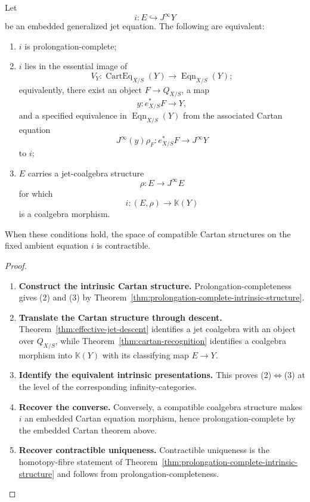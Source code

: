 \begin{corollary}
Let
\[
  i:E\hookrightarrow J^\infty Y
\]
be an embedded generalized jet equation. The following are equivalent:
\begin{enumerate}
\item \(i\) is prolongation-complete;
\item \(i\) lies in the essential image of
\[
  V_Y:
  \operatorname{CartEq}_{X/S}(Y)\longrightarrow\operatorname{Eqn}_{X/S}(Y);
\]
equivalently, there exist an object \(F\to Q_{X/S}\), a map
\[
  y:e_{X/S}^*F\to Y,
\]
and a specified equivalence in \(\operatorname{Eqn}_{X/S}(Y)\) from the associated
Cartan equation
\[
  J^\infty(y)\rho_F:e_{X/S}^*F\to J^\infty Y
\]
to \(i\);
\item \(E\) carries a jet-coalgebra structure
\[
  \rho:E\to J^\infty E
\]
for which
\[
  i:(E,\rho)\to\mathbb K(Y)
\]
is a coalgebra morphism.
\end{enumerate}
When these conditions hold, the space of compatible Cartan structures on the
fixed ambient equation \(i\) is contractible.
\end{corollary}

\begin{proof}
\leavevmode
\begin{enumerate}[label=\textup{(\arabic*)}]
    \item \textbf{Construct the intrinsic Cartan structure.}
Prolongation-completeness gives \textup{(2)} and \textup{(3)} by
Theorem~\ref{thm:prolongation-complete-intrinsic-structure}.

    \item \textbf{Translate the Cartan structure through descent.}
Theorem~\ref{thm:effective-jet-descent}
identifies a jet coalgebra with an object over \(Q_{X/S}\), while
Theorem~\ref{thm:cartan-recognition} identifies a coalgebra morphism into
\(\mathbb K(Y)\) with its classifying map \(E\to Y\).

    \item \textbf{Identify the equivalent intrinsic presentations.}
This proves
\textup{(2)}\(\Leftrightarrow\)\textup{(3)} at the level of the corresponding
infinity-categories.

    \item \textbf{Recover the converse.}
Conversely, a compatible coalgebra structure makes \(i\) an embedded Cartan
equation morphism, hence prolongation-complete by the embedded Cartan theorem above.

    \item \textbf{Recover contractible uniqueness.}
Contractible uniqueness is the homotopy-fibre statement of
Theorem~\ref{thm:prolongation-complete-intrinsic-structure} and follows from
prolongation-completeness.
\end{enumerate}
\end{proof}

